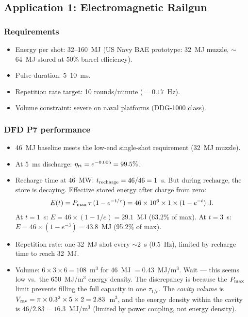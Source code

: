 \documentclass[11pt]{article}
\newcommand{\ee}[1]{\times 10^{#1}}
\newcommand{\Pmax}{P_{\rm max}}
\begin{document}
\subsection{Application 1: Electromagnetic Railgun}

\subsubsection{Requirements}
\begin{itemize}[nosep]
  \item Energy per shot: 32--160~MJ (US Navy BAE prototype: 32~MJ muzzle,
    $\sim$64~MJ stored at 50\% barrel efficiency).
  \item Pulse duration: 5--10~ms.
  \item Repetition rate target: 10 rounds/minute ($= 0.17$~Hz).
  \item Volume constraint: severe on naval platforms (DDG-1000 class).
\end{itemize}

\subsubsection{DFD P7 performance}
\begin{itemize}[nosep]
  \item 46~MJ baseline meets the low-end single-shot requirement (32~MJ muzzle).
  \item At 5~ms discharge: $\eta_{\rm rt} = e^{-0.005} = 99.5\%$.
  \item Recharge time at 46~MW: $t_{\rm recharge} = 46/46 = 1$~s.
    But during recharge, the store is decaying. Effective stored energy
    after charge from zero:
    \begin{equation}
    E(t) = \Pmax\,\tau\,(1 - e^{-t/\tau}) = 46\ee{6}\times 1\times(1 - e^{-t})~\text{J}.
    \end{equation}
    At $t = 1$~s: $E = 46\times(1 - 1/e) = 29.1$~MJ (63.2\% of max).
    At $t = 3$~s: $E = 46\times(1 - e^{-3}) = 43.8$~MJ (95.2\% of max).
  \item Repetition rate: one 32~MJ shot every $\sim$2~s (0.5~Hz),
    limited by recharge time to reach 32~MJ.
  \item Volume: $6\times 3\times 6 = 108$~m$^3$ for 46~MJ $= 0.43$~MJ/m$^3$.
    Wait --- this seems low vs.\ the 650~MJ/m$^3$ energy density. The
    discrepancy is because the $\Pmax$ limit prevents filling the full
    capacity in one $\tau_{1/e}$. The \emph{cavity volume} is
    $V_{\rm cav} = \pi\times 0.3^2\times 5\times 2 = 2.83$~m$^3$,
    and the energy density within the cavity is $46/2.83 = 16.3$~MJ/m$^3$
    (limited by power coupling, not energy density).
\end{itemize}
\end{document}
